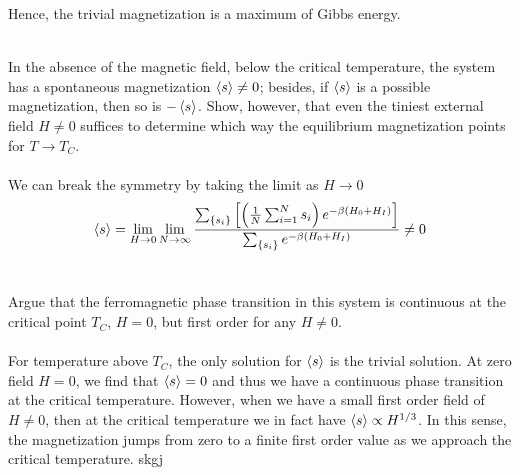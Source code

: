 \documentclass[11pt,letterpaper]{article}
\begin{document}
		\ea
		Hence, the trivial magnetization is a maximum of Gibbs energy. 
		\\ \\
		\item
		In the absence of the magnetic field, below the critical temperature, the system has a 
		spontaneous magnetization $\braket s \ne 0$; besides, if $\braket s$ is a possible
		magnetization, then so is $-\braket s$. Show, however, that even the tiniest external
		field $H\ne 0$ suffices to determine which way the equilibrium magnetization points for
		$T\to T_C$. 
		\\
		\\
		We can break the symmetry by taking the limit as $H\to 0$
		\[
			\braket s = \lim_{H\to 0}\lim_{N\to \infty} \frac{\sum_{\{s_i\}}
			\left[\left(\frac{1}{N}\sum_{i=1}^N s_i\right)e^{-\beta(H_0+H_I)}\right]}{\sum_{\{s_i\}}
			e^{-\beta(H_0+H_I)}} \ne 0
		\]
		\\
		\item
		Argue that the ferromagnetic phase transition in this system is continuous at the critical point
		$T_C$, $H=0$, but first order for any $H\ne 0$. 
		\\
		\\
		For temperature above $T_C$, the only solution for $\braket s$ is the trivial solution. At
		zero field $H=0$, we find that $\braket s=0$ and thus we have a continuous phase transition 
		at the critical temperature. However, when we have a small first order field of $H\ne 0$, then
		at the critical temperature we in fact have $\braket s \propto H^{1/3}$. In this sense,
		the magnetization jumps from zero to a finite first order value as we approach 
		the critical temperature. 
		skgj
		\eenum
\eenum
\end{document}
